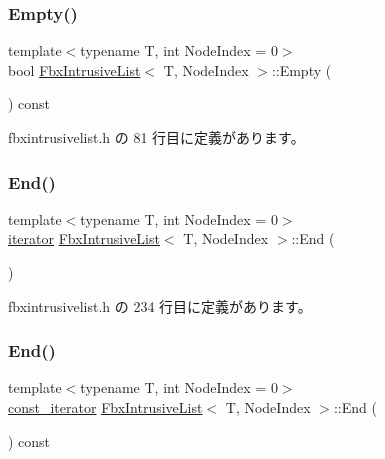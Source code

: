 \subsubsection{\texorpdfstring{Empty()}{Empty()}}
{\footnotesize\ttfamily template$<$typename T, int Node\+Index = 0$>$ \\
bool \hyperlink{class_fbx_intrusive_list}{Fbx\+Intrusive\+List}$<$ T, Node\+Index $>$\+::Empty (\begin{DoxyParamCaption}{ }\end{DoxyParamCaption}) const\hspace{0.3cm}{\ttfamily [inline]}}



 fbxintrusivelist.\+h の 81 行目に定義があります。

\mbox{\label{class_fbx_intrusive_list_aca923b70771ffd74088c8cfc0b70f3da}} 
\subsubsection{\texorpdfstring{End()}{End()}\hspace{0.1cm}{\footnotesize\ttfamily [1/2]}}
{\footnotesize\ttfamily template$<$typename T, int Node\+Index = 0$>$ \\
\hyperlink{class_fbx_intrusive_list_ae1012cd86e3ff0a4a49c982f0d34b4e7}{iterator} \hyperlink{class_fbx_intrusive_list}{Fbx\+Intrusive\+List}$<$ T, Node\+Index $>$\+::End (\begin{DoxyParamCaption}{ }\end{DoxyParamCaption})\hspace{0.3cm}{\ttfamily [inline]}}



 fbxintrusivelist.\+h の 234 行目に定義があります。

\mbox{\label{class_fbx_intrusive_list_a0d2ee805c1c4c81b8b2ec06f281bb937}} 
\subsubsection{\texorpdfstring{End()}{End()}\hspace{0.1cm}{\footnotesize\ttfamily [2/2]}}
{\footnotesize\ttfamily template$<$typename T, int Node\+Index = 0$>$ \\
\hyperlink{class_fbx_intrusive_list_a4c0c567c56a712e7ffca9c6bb5990169}{const\+\_\+iterator} \hyperlink{class_fbx_intrusive_list}{Fbx\+Intrusive\+List}$<$ T, Node\+Index $>$\+::End (\begin{DoxyParamCaption}{ }\end{DoxyParamCaption}) const\hspace{0.3cm}{\ttfamily [inline]}}



